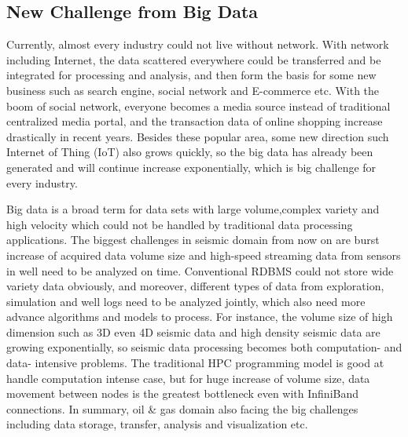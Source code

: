 \subsection{New Challenge from Big Data}
Currently, almost every industry could not live without network. With network including Internet, the data scattered everywhere could be transferred and be integrated for processing and analysis, and then form the basis for some new business such as search engine, social network and E-commerce etc. With the boom of social network, everyone becomes a media source instead of traditional centralized media portal, and the transaction data of online shopping increase drastically in recent years. Besides these popular area, some new direction such Internet of Thing (IoT) also grows quickly, so the big data has already been generated and will continue increase exponentially, which is big challenge for every industry.    

Big data \cite{WikiBigData} is a broad term for data sets with large volume,complex variety and high velocity which could not be handled by traditional data processing applications. The biggest challenges in seismic domain from now on are burst increase of acquired data volume size and high-speed streaming data from sensors in well need to be analyzed on time. Conventional RDBMS could not store wide variety data obviously, and moreover, different types of data from exploration, simulation and well logs need to be analyzed jointly, which also need more advance algorithms and models to process. For instance, the volume size of high dimension such as 3D even 4D seismic data and high density seismic data are growing exponentially, so seismic data processing becomes both computation- and data- intensive problems. The traditional HPC programming model is good at handle computation intense case, but for huge increase of volume size, data movement between nodes is the greatest bottleneck even with InfiniBand connections. In summary, oil \& gas domain also facing the big challenges including data storage, transfer, analysis and visualization etc.

